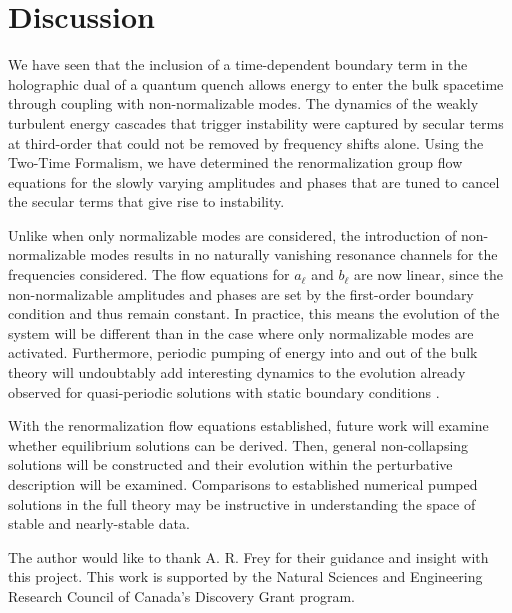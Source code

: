 \documentclass[letterpaper,11pt]{article}
\begin{document}

\section{Discussion}
\label{sec: discussion}

We have seen that the inclusion of a time-dependent boundary term in the holographic dual of a quantum quench allows energy to enter the bulk spacetime through coupling with non-normalizable modes. The dynamics of the weakly turbulent energy cascades that trigger instability were captured by secular terms at third-order that could not be removed by frequency shifts alone. Using the Two-Time Formalism, we have determined the renormalization group flow equations for the slowly varying amplitudes and phases that are tuned to cancel the secular terms that give rise to instability. 

Unlike when only normalizable modes are considered, the introduction of non-normalizable modes results in no naturally vanishing resonance channels for the frequencies considered. The flow equations for $a_\ell$ and $b_\ell$ are now linear, since the non-normalizable amplitudes and phases are set by the first-order boundary condition and thus remain constant. In practice, this means the evolution of the system will be different than in the case where only normalizable modes are activated. Furthermore, periodic pumping of energy into and out of the bulk theory will undoubtably add interesting dynamics to the evolution already observed for quasi-periodic solutions with static boundary conditions \cite{TTF}.

With the renormalization flow equations established, future work will examine whether equilibrium solutions can be derived. Then, general non-collapsing solutions will be constructed and their evolution within the perturbative description will be examined. Comparisons to established numerical pumped solutions in the full theory may be instructive in understanding the space of stable and nearly-stable data.  


\acknowledgments The author would like to thank A. R. Frey for their guidance and insight with this project. This work is supported by the Natural Sciences and Engineering Research Council of Canada's Discovery Grant program.

\end{document}
